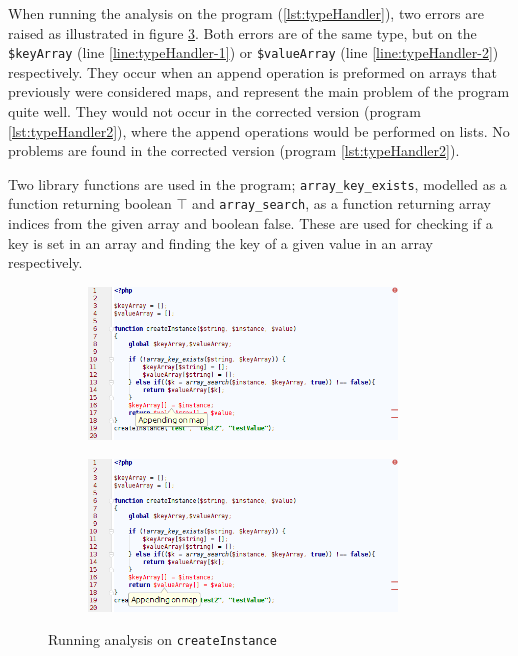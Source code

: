 When running the analysis on the program (\ref{lst:typeHandler}), two errors are raised as illustrated in figure \ref{fig:typeHandlerScreenshot}. Both errors are of the same type, but on the \texttt{\$keyArray} (line \ref{line:typeHandler-1}) or \texttt{\$valueArray} (line \ref{line:typeHandler-2}) respectively. They occur when an append operation is preformed on arrays that previously were considered maps, and represent the main problem of the program quite well. They would not occur in the corrected version (program \ref{lst:typeHandler2}), where the append operations would be performed on lists. No problems are found in the corrected version (program \ref{lst:typeHandler2}).

Two library functions are used in the program; \texttt{array\_key\_exists}, modelled as a function returning boolean $\top$ and \texttt{array\_search}, as a function returning array indices from the given array and boolean false. These are used for checking if a key is set in an array and finding the key of a given value in an array respectively.

\begin{figure}
\centering

\begin{subfigure}{\textwidth}
\centering
\includegraphics[width=0.9\textwidth]{chapters/caseStudy/screens/part1}
\label{fig:typeHandlerScreenshot-1}
\end{subfigure}

\begin{subfigure}{\textwidth}
\centering
\includegraphics[width=0.9\textwidth]{chapters/caseStudy/screens/part2}
\label{fig:typeHandlerScreenshot-2}
\end{subfigure}

\caption{Running analysis on \texttt{createInstance}}
\label{fig:typeHandlerScreenshot}
\end{figure}
